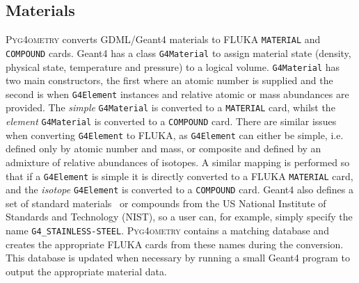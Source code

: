 \documentclass[preprint,12pt]{elsarticle}
\newcommand{\pyinline}[1]{\lstinline[postbreak={}]{#1}}
\newcommand{\cpinline}[1]{\lstinline[postbreak={}]{#1}}
\newcommand{\fluka}[1]{\texttt{\MakeUppercase{#1}}}
\newcommand{\PYGEOMETRY}{\textsc{Pyg4ometry}}
\begin{document}
\subsection{Materials}
\PYGEOMETRY{} converts GDML/Geant4 materials to FLUKA \verb|MATERIAL| and \verb|COMPOUND| cards.
Geant4 has a class \cpinline{G4Material} to assign material state (density, physical state, temperature and pressure)
to a logical volume. \cpinline{G4Material} has two main constructors, the first where an atomic number is supplied and
the second is when \cpinline{G4Element} instances and relative atomic or mass abundances are provided. The {\em simple}
\cpinline{G4Material} is converted to a \fluka{material} card, whilst the {\em element} \cpinline{G4Material}  is converted to a
\fluka{compound} card. There are similar issues when converting \cpinline{G4Element} to FLUKA, as \cpinline{G4Element}
can either be simple, i.e. defined only by atomic number and mass, or composite and defined by an admixture of
relative abundances of isotopes. A similar mapping is performed so that if a \cpinline{G4Element} is simple it is
directly converted to a FLUKA \fluka{MATERIAL} card, and the {\it isotope} \cpinline{G4Element} is converted to a \fluka{compound}
card. Geant4 also defines a set of standard materials~\cite{Geant4MaterialDB} or compounds from the US National Institute
of Standards and Technology (NIST), so a user can, for example, simply
specify the name \pyinline{G4_STAINLESS-STEEL}. \PYGEOMETRY{}  contains a matching database and creates the appropriate FLUKA
cards from these names during the conversion. This database is updated when
necessary by running a small Geant4 program to output the appropriate material data.
\end{document}
